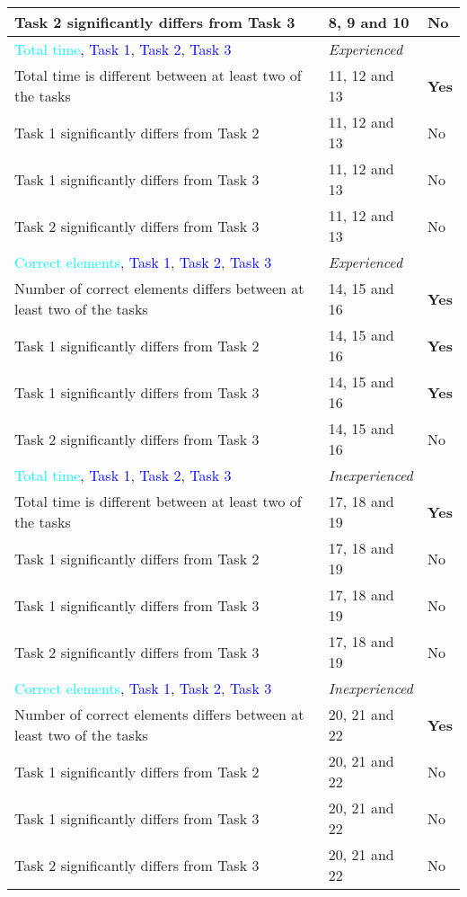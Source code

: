 \begin{longtable}{p{}|p{}|p{}}
		Task 2 significantly differs from Task 3 & 8, 9 and 10 & No  \\ \hline
		\textcolor{cyan}{Total time}, \textcolor{blue}{Task 1}, \textcolor{blue}{Task 2}, \textcolor{blue}{Task 3} & \textit{Experienced}  &  \\
		Total time is different between at least two of the tasks & 11, 12 and 13 & \textbf{Yes}  \\
		Task 1 significantly differs from Task 2 & 11, 12 and 13  & No  \\ 
		Task 1 significantly differs from Task 3 & 11, 12 and 13  & No  \\ 
		Task 2 significantly differs from Task 3 & 11, 12 and 13 & No  \\ \hline
		\textcolor{cyan}{Correct elements}, \textcolor{blue}{Task 1}, \textcolor{blue}{Task 2}, \textcolor{blue}{Task 3} & \textit{Experienced}  &  \\
		Number of correct elements differs between at least two of the tasks & 14, 15 and 16 & \textbf{Yes}  \\
		Task 1 significantly differs from Task 2 & 14, 15 and 16 & \textbf{Yes}  \\ 
		Task 1 significantly differs from Task 3 & 14, 15 and 16 & \textbf{Yes} \\ 
		Task 2 significantly differs from Task 3 & 14, 15 and 16 & No  \\ \hline
		\textcolor{cyan}{Total time}, \textcolor{blue}{Task 1}, \textcolor{blue}{Task 2}, \textcolor{blue}{Task 3} & \textit{Inexperienced}  &  \\
		Total time is different between at least two of the tasks & 17, 18 and 19 & \textbf{Yes}  \\
		Task 1 significantly differs from Task 2 & 17, 18 and 19 & No  \\ 
		Task 1 significantly differs from Task 3 & 17, 18 and 19 & No  \\ 
		Task 2 significantly differs from Task 3 & 17, 18 and 19 & No  \\ \hline
		\textcolor{cyan}{Correct elements}, \textcolor{blue}{Task 1}, \textcolor{blue}{Task 2}, \textcolor{blue}{Task 3} & \textit{Inexperienced}  &  \\
		Number of correct elements differs between at least two of the tasks & 20, 21 and 22 & \textbf{Yes}  \\
		Task 1 significantly differs from Task 2 & 20, 21 and 22 & No  \\ 
		Task 1 significantly differs from Task 3 & 20, 21 and 22 & No \\ 
		Task 2 significantly differs from Task 3 & 20, 21 and 22 & No  \\ \hline
	\end{longtable}